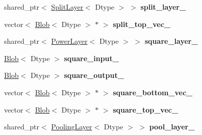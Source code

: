 \begin{DoxyCompactItemize}
\mbox{\label{classcaffe_1_1_l_r_n_layer_aa4b94da5f917898c9242ca37758d6b1d}} 
shared\+\_\+ptr$<$ \mbox{\hyperlink{classcaffe_1_1_split_layer}{Split\+Layer}}$<$ Dtype $>$ $>$ {\bfseries split\+\_\+layer\+\_\+}
\item 
\mbox{\label{classcaffe_1_1_l_r_n_layer_adeca874ee4df5d495c90c439b4ff13a9}} 
vector$<$ \mbox{\hyperlink{classcaffe_1_1_blob}{Blob}}$<$ Dtype $>$ $\ast$ $>$ {\bfseries split\+\_\+top\+\_\+vec\+\_\+}
\item 
\mbox{\label{classcaffe_1_1_l_r_n_layer_a172311b7da05c7286f7ecef1924f2140}} 
shared\+\_\+ptr$<$ \mbox{\hyperlink{classcaffe_1_1_power_layer}{Power\+Layer}}$<$ Dtype $>$ $>$ {\bfseries square\+\_\+layer\+\_\+}
\item 
\mbox{\label{classcaffe_1_1_l_r_n_layer_a29f919cb92605da4989495adc837c8c9}} 
\mbox{\hyperlink{classcaffe_1_1_blob}{Blob}}$<$ Dtype $>$ {\bfseries square\+\_\+input\+\_\+}
\item 
\mbox{\label{classcaffe_1_1_l_r_n_layer_aae76f6981028448a54f3ef53fc460867}} 
\mbox{\hyperlink{classcaffe_1_1_blob}{Blob}}$<$ Dtype $>$ {\bfseries square\+\_\+output\+\_\+}
\item 
\mbox{\label{classcaffe_1_1_l_r_n_layer_af00313ddfd6919120f919e10cbd79f86}} 
vector$<$ \mbox{\hyperlink{classcaffe_1_1_blob}{Blob}}$<$ Dtype $>$ $\ast$ $>$ {\bfseries square\+\_\+bottom\+\_\+vec\+\_\+}
\item 
\mbox{\label{classcaffe_1_1_l_r_n_layer_a9c5674991b1a562b54a60be65b76f7e4}} 
vector$<$ \mbox{\hyperlink{classcaffe_1_1_blob}{Blob}}$<$ Dtype $>$ $\ast$ $>$ {\bfseries square\+\_\+top\+\_\+vec\+\_\+}
\item 
\mbox{\label{classcaffe_1_1_l_r_n_layer_aa8463c78a6cdceeb1f18114096ab2895}} 
shared\+\_\+ptr$<$ \mbox{\hyperlink{classcaffe_1_1_pooling_layer}{Pooling\+Layer}}$<$ Dtype $>$ $>$ {\bfseries pool\+\_\+layer\+\_\+}
\item 
\mbox{\label{classcaffe_1_1_l_r_n_layer_addfe8dc592ca7f06efb36e6f0fa8dca0}} 

\end{DoxyCompactItemize}
